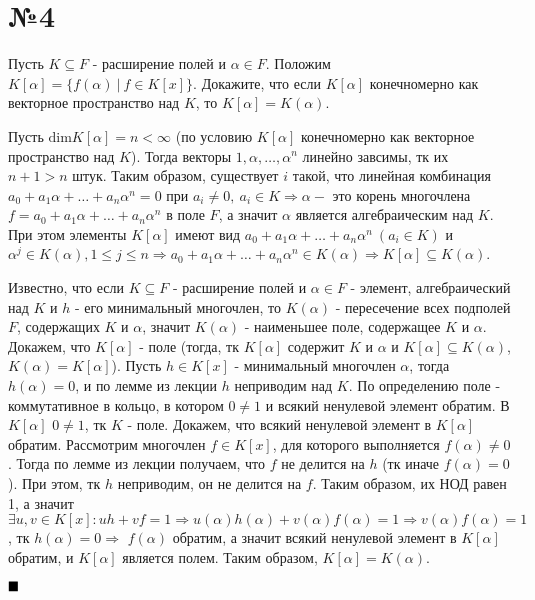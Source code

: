 \documentclass[a4paper, 16pt]{article}
\renewcommand{\inf}{\infty}
\newenvironment{proof}[1][Доказательство]{%
	\begin{trivlist}
		\item[\hskip \labelsep {\bfseries #1:}]
		\item \hspace{14pt}
	}{
		$ \hfill\blacksquare $
	\end{trivlist}
	\hfill\break
}
\begin{document}
	\section*{№4}
	
		Пусть $K \subseteq F$ - расширение полей и $\alpha \in F$. Положим $K[\alpha] = \{f(\alpha) \ | \ f \in K[x]\}$. Докажите, что если $K[\alpha]$ конечномерно как векторное пространство над $K$, то
		$K[\alpha] = K(\alpha)$.
		
		\begin{proof}
			Пусть $\text{dim}K[\alpha] = n < \inf$ (по условию $K[\alpha]$ конечномерно как векторное пространство над $K$). Тогда 
			векторы $1, \alpha, \dots, \alpha^n$ линейно завсимы, тк их $n + 1 > n$ штук. Таким образом, существует $i$ такой, что линейная комбинация $a_0 + a_1 \alpha + \dots + a_n\alpha^n = 0$ при $a_i \ne 0, \ a_i \in K \Rightarrow \alpha - $ это корень многочлена $f = a_0 + a_1 \alpha + \dots + a_n\alpha^n$ в поле $F$, а значит $\alpha$ является алгебраическим над $K$. При этом элементы $K[\alpha]$ имеют вид $a_0 + a_1 \alpha + \dots + a_n\alpha^n \ (a_i \in K)$ и $\alpha^j \in K(\alpha), 1 \leq j \leq n \Rightarrow a_0 + a_1 \alpha + \dots + a_n\alpha^n  \in K(\alpha) \Rightarrow K[\alpha] \subseteq K(\alpha)$.
			
			Известно, что если $K \subseteq F$ - расширение полей и $\alpha \in F$ - элемент, алгебраический над $K$ и $h$ - его минимальный многочлен, то $K(\alpha)$ - пересечение всех подполей $F$, содержащих $K$ и $\alpha$, значит $K(\alpha)$ - наименьшее поле, содержащее $K$ и $\alpha$. Докажем, что $K[\alpha]$ - поле (тогда, тк $K[\alpha]$ содержит $K$ и $\alpha$ и $K[\alpha] \subseteq K(\alpha)$, $K(\alpha) = K[\alpha]$). Пусть $h \in K[x]$ - минимальный многочлен $\alpha$, тогда $h(\alpha) = 0$, и по лемме из лекции $h$ неприводим над $K$. По определению поле - коммутативное в кольцо, в котором $0 \ne 1$ и всякий ненулевой элемент обратим. В $K[\alpha]$ $0 \ne 1$, тк $K$ - поле. Докажем, что всякий ненулевой элемент в $K[\alpha]$ обратим. Рассмотрим многочлен $f \in K[x]$, для которого выполняется $f(\alpha) \ne 0$. Тогда по лемме из лекции получаем, что $f$ не делится на $h$ (тк иначе $f(\alpha) = 0$). При этом, тк $h$ неприводим, он не делится  на $f$. Таким образом, их НОД равен 1, а значит $\exists u, v \in K[x]: 
			uh + vf = 1 \Rightarrow u(\alpha)h(\alpha) + v(\alpha)f(\alpha) = 1 \Rightarrow v(\alpha)f(\alpha) = 1$, тк $h(\alpha) = 0 \Rightarrow$
			$f(\alpha)$ обратим, а значит всякий ненулевой элемент в $K[\alpha]$ обратим, и $K[\alpha]$ является полем. Таким образом, $K[\alpha] = K(\alpha)$.
		\end{proof}
	
	
	
	
	
	
	
	
	
	
	
	
	
	
	
	
	
	
	
	
	
	
	
	
	
	
	
	
	
	
\end{document}
